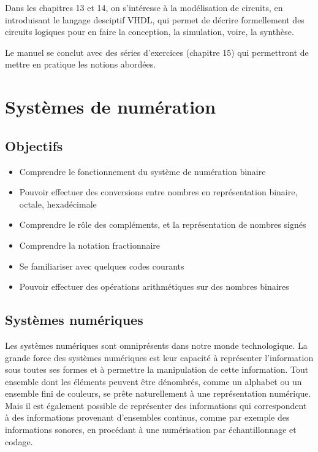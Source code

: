 \documentclass[11pt]{article}
\begin{document}
Dans les chapitres 13 et 14, on s'intéresse à la modélisation de
circuits, en introduisant le langage desciptif VHDL, qui permet de
décrire formellement des circuits logiques pour en faire la
conception, la simulation, voire, la synthèse.

Le manuel se conclut avec des séries d'exercices (chapitre 15) qui
permettront de mettre en pratique les notions abordées.


\setcounter{tocdepth}{3}
\tableofcontents
\listoffigures
\listoftables
\listoflistings



\section{Systèmes de numération}
\label{sec:orgd8ba81b}


\subsection{Objectifs}
\label{sec:orgab0c52a}

\begin{itemize}
\item Comprendre le fonctionnement du système de numération binaire
\item Pouvoir effectuer des conversions entre nombres en représentation
binaire, octale, hexadécimale
\item Comprendre le rôle des compléments, et la représentation de nombres signés
\item Comprendre la notation fractionnaire
\item Se familiariser avec quelques codes courants
\item Pouvoir effectuer des opérations arithmétiques sur des nombres binaires
\end{itemize}

\subsection{Systèmes numériques}
\label{sec:org7d3a201}

Les systèmes numériques sont omniprésents dans notre monde
technologique. La grande force des systèmes numériques est leur
capacité à représenter l'information sous toutes ses formes et à
permettre la manipulation de cette information. Tout ensemble dont les
éléments peuvent être dénombrés, comme un alphabet ou un ensemble fini
de couleurs, se prête naturellement à une représentation
numérique. Mais il est également possible de représenter des
informations qui correspondent à des informations provenant
d'ensembles continus, comme par exemple des informations sonores, en
procédant à une numérisation par échantillonnage et codage. 
\end{document}

